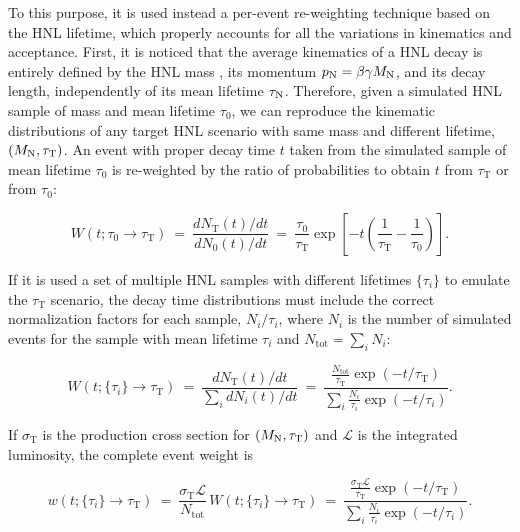 To this purpose, it is used instead a per-event re-weighting technique
based on the HNL lifetime, which properly accounts for all the
variations in kinematics and acceptance.
First, it is noticed that the average kinematics of a HNL decay
is entirely defined by the HNL mass \mhnl, its momentum
$p_\mathrm{N}=\beta\gamma M_{\mathrm{N}}$, and its decay length,
independently of its mean lifetime $\tau_\mathrm{N}$.
Therefore, given a simulated HNL sample of mass \mhnl
and mean lifetime $\tau_0$, we can reproduce the kinematic
distributions of any target HNL scenario with same mass and 
different lifetime, $(M_{\mathrm{N}}, \tau_{\mathrm T})$.
An event with proper decay time $t$ taken from the simulated sample
of mean lifetime $\tau_0$ is re-weighted by the ratio of
probabilities to obtain $t$ from $\tau_{\mathrm T}$ or from $\tau_0$:
\begin{linenomath}
  \begin{equation}
    W(t; \tau_0\to\tau_{\mathrm T}) ~=~ \frac{dN_{\mathrm T}(t)/dt}{dN_0(t)/dt} ~=~
    \frac{\tau_0}{\tau_{\mathrm T}}\exp{\left[-t\left(\frac{1}{\tau_{\mathrm T}}-\frac{1}{\tau_0}\right)\right]}.
  \label{eq:ctauReweightingSingle}
  \end{equation}
\end{linenomath}
If it is used a set of multiple HNL samples with different lifetimes
$\{\tau_i\}$ to emulate the $\tau_{\mathrm T}$ scenario, the
decay time distributions must include the correct normalization
factors for each sample, $N_i/\tau_i$, where $N_i$ is the number of
simulated events for the sample with mean lifetime $\tau_i$ and
$N_{\mathrm{tot}} = \sum_i N_i$:
\begin{linenomath}
  \begin{equation*}
    W(t; \{\tau_i\}\to\tau_{\mathrm T}) ~=~ \frac{dN_{\mathrm T}(t)/dt}{\sum_i dN_i(t)/dt} ~=~
    \frac{\frac{N_{\mathrm{tot}}}{\tau_{\mathrm{T}}}\exp{(-t/\tau_{\mathrm{T}})}}
         {\sum_i\frac{N_{i}}{\tau_i}\exp{(-t/\tau_i)}}.
  \end{equation*}
\end{linenomath}
If $\sigma_{\mathrm{T}}$ is the production cross section for
$(M_{\mathrm{N}},\tau_{\mathrm T})$ and $\mathcal{L}$ is the integrated luminosity,
the complete event weight is
\begin{linenomath}
  \begin{equation}
    w(t; \{\tau_i\}\to\tau_{\mathrm T}) ~=~
    \frac{\sigma_{\mathrm{T}}\mathcal{L}}{N_{\mathrm{tot}}}\,W(t;\{\tau_i\}\to\tau_{\mathrm T})
     ~=~ \frac{\frac{\sigma_{\mathrm{T}}\mathcal{L}}{\tau_{\mathrm{T}}}\exp{(-t/\tau_{\mathrm{T}})}}
         {\sum_i\frac{N_{i}}{\tau_i}\exp{(-t/\tau_i)}}.
  \label{eq:ctauReweighting}
  \end{equation}
\end{linenomath}
